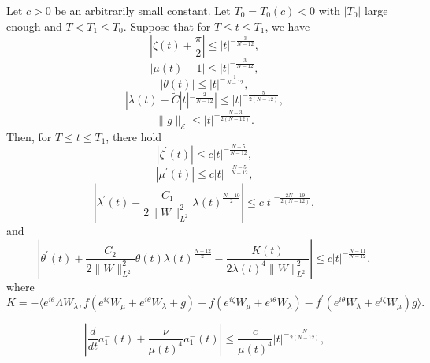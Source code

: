 \documentclass[10pt,a4paper]{amsart}
\begin{document}
\begin{prop}\label{lem3.1}
Let $c>0$ be an arbitrarily small constant. Let $T_0=T_0(c)<0$ with $|T_0|$ large enough and $T<T_1 \leq T_0$. Suppose that for $T\leq t \leq T_1$, we have
\begin{equation}
\label{mode1}
|\zeta (t) +\frac{\pi}{2}| \leq |t|^{-\frac{3}{N-12}},
\end{equation}
\begin{equation}
\label{mode2}
|\mu (t) -1| \leq |t|^{-\frac{3}{N-12}},
\end{equation}
\begin{equation}
\label{mode3}
|\theta (t)| \leq |t|^{-\frac{1}{N-12}},
\end{equation}
\begin{equation}
\label{mode4}
|\lambda (t) - \tilde{C} |t|^{-\frac{2}{N-12}} |\leq 
|t|^{-\frac{5}{2(N-12)}},
\end{equation}
\begin{equation}
\label{mode5}
\|g\|_{\mathcal{E}} \leq |t|^{-\frac{N-3}{2(N-12)}}.
\end{equation}
Then, for $T\leq t\leq T_1$, there hold
\begin{equation}
\label{mode6}
|\zeta^\prime (t)|\leq c |t|^{-\frac{N-5}{N-12}},
\end{equation}
\begin{equation}
\label{mode7}
|\mu^\prime (t)| \leq c |t|^{-\frac{N-5}{N-12}},
\end{equation}
\begin{equation}
\label{mode8}
\left|\lambda^\prime (t) - \frac{C_1}{2\|W\|_{L^2}^2} \lambda(t)^{\frac{N-10}{2}}\right|\leq c |t|^{-\frac{2N-19}{2(N-12)}} ,
\end{equation}
and
\begin{equation}
\label{mode9}
\left|\theta^\prime (t) + \frac{C_2}{2\|W\|_{L^2}^2}\theta(t)\lambda(t)^{\frac{N-12}{2}} -\frac{K(t)}{2\lambda(t)^4 \|W\|_{L^2}^2} \right|\leq c |t|^{-\frac{N-11}{N-12}} ,
\end{equation}
where
$$K= - \langle  e^{i\theta}  \Lambda W_\lambda ,  f(e^{i\zeta} W_\mu +e^{i\theta} W_\lambda +g) - f(e^{i\zeta} W_\mu +e^{i\theta} W_\lambda) -f^\prime (e^{i\theta} W_\lambda +e^{i\zeta} W_\mu) g \rangle .$$
\end{prop}

\begin{equation}
\label{stcoe2}
\left|\frac{d}{dt}a_1^- (t) + \frac{\nu}{\mu (t)^4} a_1^- (t)\right| \leq \frac{c}{\mu(t)^4} |t|^{-\frac{N}{2(N-12)}},
\end{equation}
\end{document}
